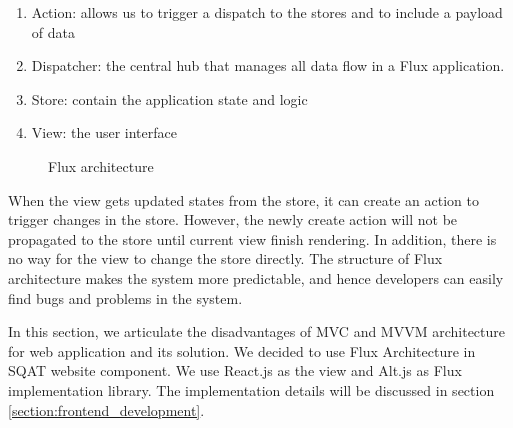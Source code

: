 \begin{enumerate}
    \item Action: allows us to trigger a dispatch to the stores and to include a payload of data
    \item Dispatcher: the central hub that manages all data flow in a Flux application. 
    \item Store: contain the application state and logic
    \item View: the user interface
\end{enumerate}

\begin{figure}[t]
\centering
{}
\caption{Flux architecture}
\label{figure:flux_architecture}
\end{figure}

When the view gets updated states from the store, it can create an action to trigger changes in the store. However, the newly create action will not be propagated to the store until current view finish rendering. In addition, there is no way for the view to change the store directly. The structure of Flux architecture makes the system more predictable, and hence developers can easily find bugs and problems in the system. 

In this section, we articulate the disadvantages of MVC and MVVM architecture for web application and its solution. We decided to use Flux Architecture in SQAT website component. We use React.js as the view and Alt.js as Flux implementation library. The implementation details will be discussed in section \ref{section:frontend_development}.
